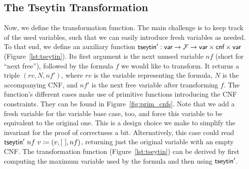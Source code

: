 \subsection{The Tseytin Transformation}
Now, we define the transformation function. The main challenge is to keep track of the used variables, such that we can easily introduce fresh variables as needed. 
To that end, we define an auxiliary function $\textsf{tseytin}' : \textsf{var} \rightarrow \mathcal{F} \rightarrow \textsf{var} \times \textsf{cnf} \times \textsf{var}$ (Figure~\ref{lst:tseytin}). 
Its first argument is the next unused variable $nf$ (short for ``next free''), followed by the formula $f$ we would like to transform. It returns a triple $(rv, N, nf')$, where $rv$ is the variable representing the formula, $N$ is the accompanying CNF, and $nf'$ is the next free variable after transforming $f$. 
The function's different cases make use of primitive functions introducing the CNF constraints. They can be found in Figure~\ref{fig:prim_cnfs}. 
Note that we add a fresh variable for the variable base case, too, and force this variable to be equivalent to the original one. This is a design choice we make to simplify the invariant for the proof of correctness a bit. Alternatively, this case could read $\textsf{tseytin}'~nf~v \coloneqq (v, [~], nf)$, returning just the original variable with an empty CNF.
The transformation function \tseytin{} (Figure~\ref{lst:tseytin}) can be derived by first computing the maximum variable used by the formula and then using $\textsf{tseytin}'$.

